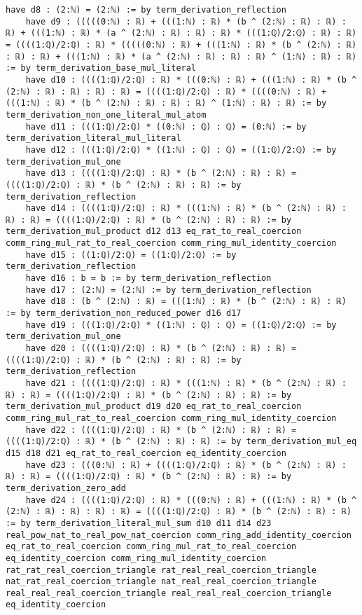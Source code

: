 \documentclass{article}
\begin{document}
\begin{tcolorbox}[colback=white!10, width=\linewidth]
\begin{lstlisting}[language=Lean4]
    have d8 : (2:ℕ) = (2:ℕ) := by term_derivation_reflection
    have d9 : (((((0:ℕ) : ℝ) + (((1:ℕ) : ℝ) * (b ^ (2:ℕ) : ℝ) : ℝ) : ℝ) + (((1:ℕ) : ℝ) * (a ^ (2:ℕ) : ℝ) : ℝ) : ℝ) * (((1:ℚ)/2:ℚ) : ℝ) : ℝ) = ((((1:ℚ)/2:ℚ) : ℝ) * (((((0:ℕ) : ℝ) + (((1:ℕ) : ℝ) * (b ^ (2:ℕ) : ℝ) : ℝ) : ℝ) + (((1:ℕ) : ℝ) * (a ^ (2:ℕ) : ℝ) : ℝ) : ℝ) ^ (1:ℕ) : ℝ) : ℝ) := by term_derivation_base_mul_literal
    have d10 : ((((1:ℚ)/2:ℚ) : ℝ) * (((0:ℕ) : ℝ) + (((1:ℕ) : ℝ) * (b ^ (2:ℕ) : ℝ) : ℝ) : ℝ) : ℝ) = ((((1:ℚ)/2:ℚ) : ℝ) * ((((0:ℕ) : ℝ) + (((1:ℕ) : ℝ) * (b ^ (2:ℕ) : ℝ) : ℝ) : ℝ) ^ (1:ℕ) : ℝ) : ℝ) := by term_derivation_non_one_literal_mul_atom
    have d11 : (((1:ℚ)/2:ℚ) * ((0:ℕ) : ℚ) : ℚ) = (0:ℕ) := by term_derivation_literal_mul_literal
    have d12 : (((1:ℚ)/2:ℚ) * ((1:ℕ) : ℚ) : ℚ) = ((1:ℚ)/2:ℚ) := by term_derivation_mul_one
    have d13 : ((((1:ℚ)/2:ℚ) : ℝ) * (b ^ (2:ℕ) : ℝ) : ℝ) = ((((1:ℚ)/2:ℚ) : ℝ) * (b ^ (2:ℕ) : ℝ) : ℝ) := by term_derivation_reflection
    have d14 : ((((1:ℚ)/2:ℚ) : ℝ) * (((1:ℕ) : ℝ) * (b ^ (2:ℕ) : ℝ) : ℝ) : ℝ) = ((((1:ℚ)/2:ℚ) : ℝ) * (b ^ (2:ℕ) : ℝ) : ℝ) := by term_derivation_mul_product d12 d13 eq_rat_to_real_coercion comm_ring_mul_rat_to_real_coercion comm_ring_mul_identity_coercion
    have d15 : ((1:ℚ)/2:ℚ) = ((1:ℚ)/2:ℚ) := by term_derivation_reflection
    have d16 : b = b := by term_derivation_reflection
    have d17 : (2:ℕ) = (2:ℕ) := by term_derivation_reflection
    have d18 : (b ^ (2:ℕ) : ℝ) = (((1:ℕ) : ℝ) * (b ^ (2:ℕ) : ℝ) : ℝ) := by term_derivation_non_reduced_power d16 d17
    have d19 : (((1:ℚ)/2:ℚ) * ((1:ℕ) : ℚ) : ℚ) = ((1:ℚ)/2:ℚ) := by term_derivation_mul_one
    have d20 : ((((1:ℚ)/2:ℚ) : ℝ) * (b ^ (2:ℕ) : ℝ) : ℝ) = ((((1:ℚ)/2:ℚ) : ℝ) * (b ^ (2:ℕ) : ℝ) : ℝ) := by term_derivation_reflection
    have d21 : ((((1:ℚ)/2:ℚ) : ℝ) * (((1:ℕ) : ℝ) * (b ^ (2:ℕ) : ℝ) : ℝ) : ℝ) = ((((1:ℚ)/2:ℚ) : ℝ) * (b ^ (2:ℕ) : ℝ) : ℝ) := by term_derivation_mul_product d19 d20 eq_rat_to_real_coercion comm_ring_mul_rat_to_real_coercion comm_ring_mul_identity_coercion
    have d22 : ((((1:ℚ)/2:ℚ) : ℝ) * (b ^ (2:ℕ) : ℝ) : ℝ) = ((((1:ℚ)/2:ℚ) : ℝ) * (b ^ (2:ℕ) : ℝ) : ℝ) := by term_derivation_mul_eq d15 d18 d21 eq_rat_to_real_coercion eq_identity_coercion
    have d23 : (((0:ℕ) : ℝ) + ((((1:ℚ)/2:ℚ) : ℝ) * (b ^ (2:ℕ) : ℝ) : ℝ) : ℝ) = ((((1:ℚ)/2:ℚ) : ℝ) * (b ^ (2:ℕ) : ℝ) : ℝ) := by term_derivation_zero_add
    have d24 : ((((1:ℚ)/2:ℚ) : ℝ) * (((0:ℕ) : ℝ) + (((1:ℕ) : ℝ) * (b ^ (2:ℕ) : ℝ) : ℝ) : ℝ) : ℝ) = ((((1:ℚ)/2:ℚ) : ℝ) * (b ^ (2:ℕ) : ℝ) : ℝ) := by term_derivation_literal_mul_sum d10 d11 d14 d23 real_pow_nat_to_real_pow_nat_coercion comm_ring_add_identity_coercion eq_rat_to_real_coercion comm_ring_mul_rat_to_real_coercion eq_identity_coercion comm_ring_mul_identity_coercion rat_rat_real_coercion_triangle rat_real_real_coercion_triangle nat_rat_real_coercion_triangle nat_real_real_coercion_triangle real_real_real_coercion_triangle real_real_real_coercion_triangle eq_identity_coercion

\end{lstlisting}
\end{tcolorbox}
\end{document}
